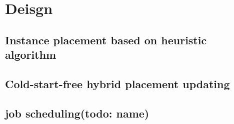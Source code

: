 \section{\sysname Deisgn}

\subsection{Instance placement based on heuristic algorithm}

\subsection{Cold-start-free hybrid placement updating}

\subsection{job scheduling(todo: name)}